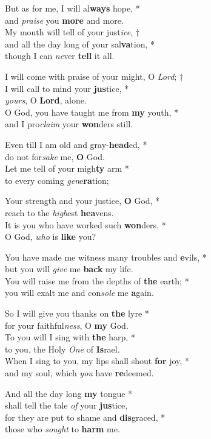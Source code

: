 But as for me, I will al\textbf{ways} hope, *\\
and \emph{praise} you \textbf{more} and more. \\
My mouth will tell of your just\emph{ice}, †\\
and all the day long of your sal\textbf{va}tion, *\\
though I can \emph{ne}ver \textbf{tell} it all. 

I will come with praise of your might, O \emph{Lord}; †\\
I will call to mind your \textbf{jus}tice, *\\
\emph{yours}, O \textbf{Lord}, alone. \\
O God, you have taught me from \textbf{my} youth, *\\
and I pro\emph{claim} your \textbf{won}ders still. 

Even till I am old and gray-\textbf{head}ed, *\\
do not for\emph{sake} me, \textbf{O} God. \\
Let me tell of your migh\textbf{ty} arm *\\
to every coming \emph{gen}e\textbf{ra}tion; 

Your strength and your justice, \textbf{O} God, *\\
reach to the \emph{high}est \textbf{hea}vens. \\
It is you who have worked such \textbf{won}ders. *\\
O God, \emph{who} is \textbf{like} you? 

You have made me witness many troubles and \textbf{e}vils, *\\
but you will \emph{give} me \textbf{back} my life. \\
You will raise me from the depths of \textbf{the} earth; *\\
you will exalt me and con\emph{sole} me \textbf{a}gain. 

So I will give you thanks on \textbf{the} lyre *\\
for your faithful\emph{ness}, O \textbf{my} God. \\
To you will I sing with \textbf{the} harp, *\\
to you, the Holy \emph{One} of \textbf{Is}rael. \\
When I sing to you, my lips shall shout \textbf{for} joy, *\\
and my soul, which \emph{you} have \textbf{re}deemed. 

And all the day long \textbf{my} tongue *\\
shall tell the tale \emph{of} your \textbf{jus}tice, \\
for they are put to shame and \textbf{dis}graced, *\\
those who \emph{sought} to \textbf{harm} me. 
